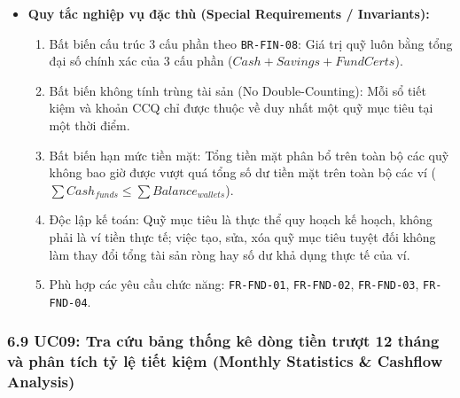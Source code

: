 \documentclass[11pt,a4paper]{article}
\providecommand{\tightlist}{
  \setlength{\itemsep}{0pt}\setlength{\parskip}{0pt}}
\begin{document}
\begin{itemize}
\begin{itemize}
    \begin{itemize}
    \tightlist
    \item
      5a1. Tại bước 5 (hoặc 2b4), Người dùng nhập số tiền mục tiêu là số
      âm (\(targetAmount < 0\)).
    \item
      5a2. Hệ thống chặn lại và thông báo lỗi: "Số tiền mục tiêu phải là
      số lớn hơn hoặc bằng 0".
    \end{itemize}
  \item
    \emph{5b. Trùng mã quỹ mục tiêu:}

    \begin{itemize}
    \tightlist
    \item
      5b1. Tại bước 5, hệ thống phát hiện mã quỹ \texttt{fundCode} đã
      tồn tại trong cơ sở dữ liệu.
    \item
      5b2. Hệ thống báo lỗi trùng mã và yêu cầu Người dùng nhập mã định
      danh khác.
    \end{itemize}
  \end{itemize}
\item
  \textbf{Quy tắc nghiệp vụ đặc thù (Special Requirements /
  Invariants):}

  \begin{enumerate}
  \def\labelenumi{\arabic{enumi}.}
  \tightlist
  \item
    Bất biến cấu trúc 3 cấu phần theo \texttt{BR-FIN-08}: Giá trị quỹ
    luôn bằng tổng đại số chính xác của 3 cấu phần
    (\(Cash + Savings + FundCerts\)).
  \item
    Bất biến không tính trùng tài sản (No Double-Counting): Mỗi sổ tiết
    kiệm và khoản CCQ chỉ được thuộc về duy nhất một quỹ mục tiêu tại
    một thời điểm.
  \item
    Bất biến hạn mức tiền mặt: Tổng tiền mặt phân bổ trên toàn bộ các
    quỹ không bao giờ được vượt quá tổng số dư tiền mặt trên toàn bộ các
    ví (\(\sum Cash_{funds} \le \sum Balance_{wallets}\)).
  \item
    Độc lập kế toán: Quỹ mục tiêu là thực thể quy hoạch kế hoạch, không
    phải là ví tiền thực tế; việc tạo, sửa, xóa quỹ mục tiêu tuyệt đối
    không làm thay đổi tổng tài sản ròng hay số dư khả dụng thực tế của
    ví.
  \item
    Phù hợp các yêu cầu chức năng: \texttt{FR-FND-01},
    \texttt{FR-FND-02}, \texttt{FR-FND-03}, \texttt{FR-FND-04}.
  \end{enumerate}
\end{itemize}

\subsubsection{6.9 UC09: Tra cứu bảng thống kê dòng tiền trượt 12 tháng
và phân tích tỷ lệ tiết kiệm (Monthly Statistics \& Cashflow
Analysis)}\label{69-uc09-tra-cux1ee9u-bux1ea3ng-thux1ed1ng-kuxea-duxf2ng-tiux1ec1n-trux1b0ux1ee3t-12-thuxe1ng-vuxe0-phuxe2n-tuxedch-tux1ef7-lux1ec7-tiux1ebft-kiux1ec7m-monthly-statistics--cashflow-analysis}
\end{document}
